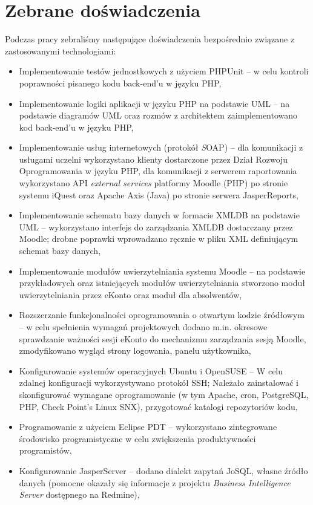 \chapter{Zebrane doświadczenia}
\label{Chapter8}

Podczas pracy zebraliśmy następujące doświadczenia bezpośrednio związane z zastosowanymi technologiami:
\begin{itemize}
\item Implementowanie testów jednostkowych z użyciem PHPUnit -- w celu kontroli poprawności pisanego kodu back-end'u w języku PHP,
\item Implementowanie logiki aplikacji w języku PHP na podstawie UML -- na podstawie diagramów UML oraz rozmów z architektem zaimplementowano kod back-end'u w języku PHP,
\item Implementowanie usług internetowych (protokół \emph SOAP) -- dla komunikacji z usługami uczelni wykorzystano klienty dostarczone przez Dział Rozwoju Oprogramowania w języku PHP, dla komunikacji z serwerem raportowania wykorzystano API \emph{external services} platformy Moodle (PHP) po stronie systemu iQuest oraz Apache Axis (Java) po stronie serwera JasperReports,
\item Implementowanie schematu bazy danych w formacie XMLDB na podstawie UML -- wykorzystano interfejs do zarządzania XMLDB dostarczany przez Moodle; drobne poprawki wprowadzano ręcznie w pliku XML definiującym schemat bazy danych,
\item Implementowanie modułów uwierzytelniania systemu Moodle -- na podstawie przykładowych oraz istniejących modułów uwierzytelniania stworzono moduł uwierzytelniania przez eKonto oraz moduł dla absolwentów,
\item Rozszerzanie funkcjonalności oprogramowania o otwartym kodzie źródłowym -- w celu spełnienia wymagań projektowych dodano m.in. okresowe sprawdzanie ważności sesji eKonto do mechanizmu zarządzania sesją Moodle, zmodyfikowano wygląd strony logowania, panelu użytkownika,
\item Konfigurowanie systemów operacyjnych Ubuntu i OpenSUSE -- W celu zdalnej konfiguracji wykorzystywano protokół SSH; Należało zainstalować i skonfigurować wymagane oprogramowanie (w tym Apache, cron, PostgreSQL, PHP, Check Point's Linux SNX), przygotować katalogi repozytoriów kodu,
\item Programowanie z użyciem Eclipse PDT -- wykorzystano zintegrowane środowisko programistyczne w celu zwiększenia produktywności programistów,
\item Konfigurowanie JasperServer -- dodano dialekt zapytań JoSQL, własne źródło danych (pomocne okazały się informacje z projektu \emph{Business Intelligence Server} dostępnego na Redmine),

\end{itemize}
